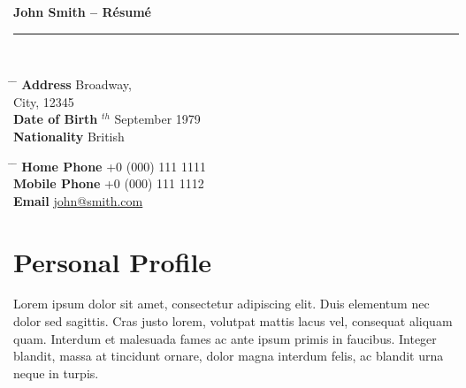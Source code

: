 \documentclass[10pt]{article} %
\renewcommand{\title}[1]{
{\huge{\color{headercolor}\textbf{#1}}}\\
\rule{\textwidth}{0.5mm}\\
}
\begin{document}

\title{John Smith -- Résumé} %


\parbox{0.5\textwidth}{
\begin{tabbing}
\hspace{3cm} \= \hspace{4cm} \= \kill
{\bf Address}  Broadway,\\
\> City, 12345 \\[3pt]
{\bf Date of Birth} $^{th}$ September 1979 \\[5pt]
{\bf Nationality} \> British
\end{tabbing}}
%
\hfill
%
\parbox{0.5\textwidth}{
\begin{tabbing}
\hspace{3cm} \= \hspace{4cm} \= \kill
{\bf Home Phone} \> +0 (000) 111 1111 \\[5pt]
{\bf Mobile Phone} \> +0 (000) 111 1112 \\[5pt]
{\bf Email} \> \href{mailto:john@smith.com}{john@smith.com}\\
\end{tabbing}}


\section{Personal Profile}

Lorem ipsum dolor sit amet, consectetur adipiscing elit. Duis elementum nec dolor sed sagittis. Cras justo lorem, volutpat mattis lacus vel, consequat aliquam quam. Interdum et malesuada fames ac ante ipsum primis in faucibus. Integer blandit, massa at tincidunt ornare, dolor magna interdum felis, ac blandit urna neque in turpis.

\end{document}
